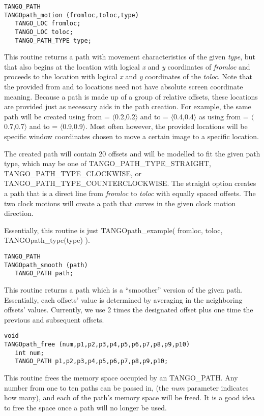 \vspace{1em}
\begin{verbatim}
TANGO_PATH
TANGOpath_motion (fromloc,toloc,type) 
   TANGO_LOC fromloc;
   TANGO_LOC toloc;
   TANGO_PATH_TYPE type;
\end{verbatim}
This routine returns a path with movement characteristics of the given
{\em type}, but that also begins at the location with logical {\em x} and
{\em y} coordinates of {\em fromloc} and proceeds to the location with logical
{\em x} and {\em y} coordinates of the {\em toloc}.  Note that the provided
from and to locations need not have absolute screen coordinate meaning.
Because a path is made up of a group of relative offsets, these locations are
provided just as necessary aids in the path creation.  For example, the same
path will be created using from = $\langle$0.2,0.2$\rangle$ and to = $\langle$0.4,0.4$\rangle$ as using from =
$\langle$0.7,0.7$\rangle$ and to = $\langle$0.9,0.9$\rangle$. Most often however, the provided locations will
be specific window coordinates chosen to move a certain image to a specific
location.

The created path will contain 20 offsets and will be modelled to fit the given
path type, which may be one of TANGO\_PATH\_TYPE\_STRAIGHT,
TANGO\_PATH\_TYPE\_CLOCKWISE, or\\
 TANGO\_PATH\_TYPE\_COUNTERCLOCKWISE.  The
straight option creates a path that is a direct line from {\em fromloc} to
{\em toloc} with equally spaced offsets.  The two clock motions will create a
path that curves in the given clock motion direction.

Essentially, this routine is just TANGOpath\_example( fromloc, toloc,
TANGOpath\_type(type) ).

\vspace{1em}
\begin{verbatim}
TANGO_PATH
TANGOpath_smooth (path) 
   TANGO_PATH path;
\end{verbatim}
This routine returns a path which is a ``smoother'' version of the given path.
Essentially, each offsets' value is determined by averaging in the neighboring
offsets' values. Currently, we use 2 times the designated offset plus one
time the previous and subsequent offsets.

\vspace{1em}
\begin{verbatim}
void
TANGOpath_free (num,p1,p2,p3,p4,p5,p6,p7,p8,p9,p10) 
   int num;
   TANGO_PATH p1,p2,p3,p4,p5,p6,p7,p8,p9,p10;
\end{verbatim}
This routine frees the memory space occupied by an TANGO\_PATH.  Any number
from one to ten paths can be passed in, (the {\em num} parameter indicates how
many), and each of the path's memory space will be freed. It is a good idea
to free the space once a path will no longer be used.

